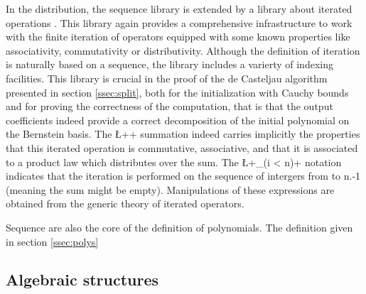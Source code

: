 \documentclass{mscs}
\begin{document}
In the \ssr{} distribution, the sequence library is extended by a
library about iterated operations \cite{BGOBP:BIG08}. This library
again provides a comprehensive infrastructure to work with the finite
iteration of operators equipped with some known properties like
associativity, commutativity or distributivity. Although the
definition of iteration is naturally based on a sequence, the library
includes a varierty of indexing facilities. This library is
crucial in the proof of the de Casteljau algorithm presented in
section \ref{ssec:split}, both for the initialization with Cauchy
bounds and for proving the correctness of the computation, that is
that the output coefficients indeed provide a correct decomposition of
the initial polynomial on the Bernstein basis. The \L+\sum+ summation
indeed carries implicitly the properties that this iterated operation
is commutative, associative, and that it is associated to a product
law which distributes over the sum. The \L+\sum_(i < n)+ notation
indicates that the iteration is performed on the sequence of intergers
from  to {n.-1} (meaning the sum might be empty).
Manipulations of these expressions are obtained from the generic
theory of iterated operators.

Sequence are also the core of the definition of polynomials. The
definition given in section \ref{ssec:polys}

\subsection{Algebraic structures}\label{ssec:algstruct}


\end{document}
